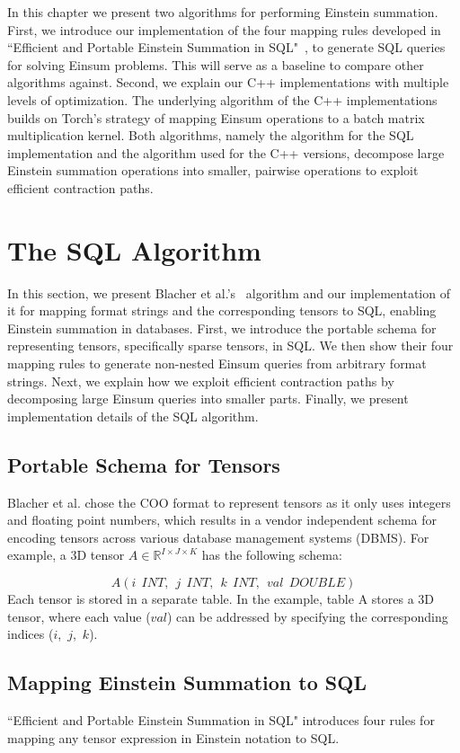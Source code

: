 In this chapter we present two algorithms for performing Einstein summation. First,
we introduce our implementation of the four mapping rules developed in ``Efficient and Portable
Einstein Summation in SQL"~\cite{sql_einsum}, to generate SQL queries for solving Einsum problems.
This will serve as a baseline to compare other algorithms against. Second, we explain our C++
implementations with multiple levels of optimization. The underlying algorithm of the C++
implementations builds on Torch's strategy of mapping Einsum operations to a batch matrix
multiplication kernel. Both algorithms, namely the algorithm for the SQL implementation and
the algorithm used for the C++ versions, decompose large Einstein summation operations
into smaller, pairwise operations to exploit efficient contraction paths.

\section{The SQL Algorithm}
In this section, we present Blacher et al.'s~\cite{sql_einsum} algorithm and our
implementation of it for mapping format strings and the corresponding tensors to SQL,
enabling Einstein summation in databases. First, we introduce the portable schema for
representing tensors, specifically sparse tensors, in SQL. We then show their four mapping
rules to generate non-nested Einsum queries from arbitrary format strings. Next, we
explain how we exploit efficient contraction paths by decomposing large Einsum queries
into smaller parts. Finally, we present implementation details of the SQL algorithm.

\subsection{Portable Schema for Tensors}
Blacher et al. chose the COO format to represent tensors as it only uses integers and
floating point numbers, which results in a vendor independent schema for encoding tensors
across various database management systems (DBMS). For example, a 3D tensor $A \in
    \mathbb{R}^{I \times J \times K}$ has the following schema:

\[
    A(i\ \ INT,\ \ j\ \ INT,\ \ k\ \ INT,\ \ val\ \ DOUBLE)
\]
%
Each tensor is stored in a separate table. In the example, table A stores a 3D tensor,
where each value ($val$) can be addressed by specifying the corresponding indices
($i$,~$j$,~$k$).

\subsection{Mapping Einstein Summation to SQL}
\label{subsec:sql:rules}
``Efficient and Portable Einstein Summation in SQL" introduces four rules for mapping
any tensor expression in Einstein notation to SQL.


